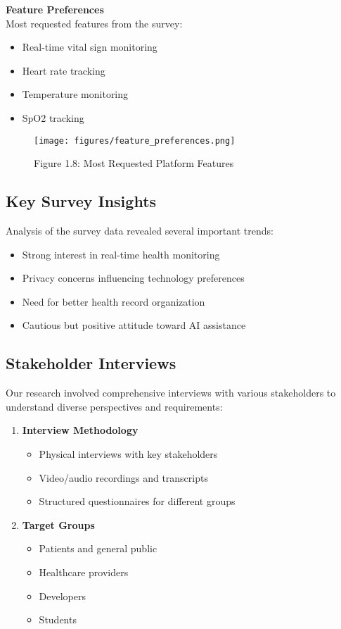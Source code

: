 \begin{minipage}{0.5\textwidth}
\textbf{Feature Preferences}\\
Most requested features from the survey:
\begin{itemize}
    \item Real-time vital sign monitoring
    \item Heart rate tracking
    \item Temperature monitoring
    \item SpO2 tracking
\end{itemize}
\end{minipage}
\begin{minipage}{0.5\textwidth}
\begin{figure}[H]
    \centering
    \texttt{[image: figures/feature\_preferences.png]}
    \caption{Figure 1.8: Most Requested Platform Features}
\end{figure}
\end{minipage}

\subsection{Key Survey Insights}
Analysis of the survey data revealed several important trends:
\begin{itemize}
    \item Strong interest in real-time health monitoring
    \item Privacy concerns influencing technology preferences
    \item Need for better health record organization
    \item Cautious but positive attitude toward AI assistance
\end{itemize}

\subsection{Stakeholder Interviews}
Our research involved comprehensive interviews with various stakeholders to understand diverse perspectives and requirements:

\begin{enumerate}
    \item \textbf{Interview Methodology}
    \begin{itemize}
        \item Physical interviews with key stakeholders
        \item Video/audio recordings and transcripts
        \item Structured questionnaires for different groups
    \end{itemize}

    \item \textbf{Target Groups}
    \begin{itemize}
        \item Patients and general public
        \item Healthcare providers
        \item Developers
        \item Students
    \end{itemize}
\end{enumerate}

